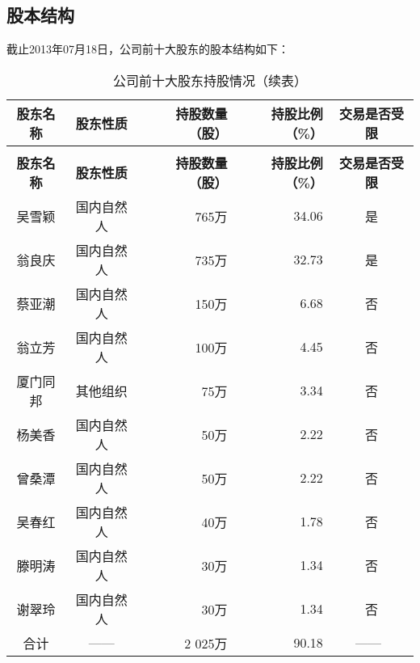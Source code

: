 \subsection{股本结构}
截止2013年07月18日，公司前十大股东的股本结构如下：
\renewcommand*{\arraystretch}{1}
\setlength{\tabcolsep}{8pt}
\begin{longtable}{>{\footnotesize}c>{\footnotesize}c>{\footnotesize}r>{\footnotesize}r>{\footnotesize}c}
\caption[公司前十大股东]{公司前十大股东持股情况}\\  %
\hline\hline
\rowcolor{mycyan} \bfseries 股东名称	&	\bfseries 股东性质	&	\bfseries 持股数量（股）	&	\bfseries 持股比例（\%）	&	\bfseries 交易是否受限	\\  \endfirsthead          %
\caption[]{公司前十大股东持股情况（续表）} \\ 
\hline\hline
\rowcolor{mycyan} \bfseries 股东名称	&	\bfseries 股东性质	&	\bfseries 持股数量（股）	&	\bfseries 持股比例（\%）	&	\bfseries 交易是否受限	\\   \endhead         %
\hline
\endfoot
\hline   %
吴雪颖	&	国内自然人	&	765万	&	34.06	&	是	\\
翁良庆	&	国内自然人	&	735万	&	32.73	&	是	\\
蔡亚潮	&	国内自然人	&	150万	&	6.68	&	否	\\
翁立芳	&	国内自然人	&	100万	&	4.45	&	否	\\
厦门同邦	&	其他组织	&	75万	&	3.34	&	否	\\
杨美香	&	国内自然人	&	50万	&	2.22	&	否	\\
曾桑潭	&	国内自然人	&	50万	&	2.22	&	否	\\
吴春红	&	国内自然人	&	40万	&	1.78	&	否	\\
滕明涛	&	国内自然人	&	30万	&	1.34	&	否	\\
谢翠玲	&	国内自然人	&	30万	&	1.34	&	否	\\
\midrule
合计	&	——	&	2 025万	&	90.18	&		—— 	\\
\bottomrule
\end{longtable}
